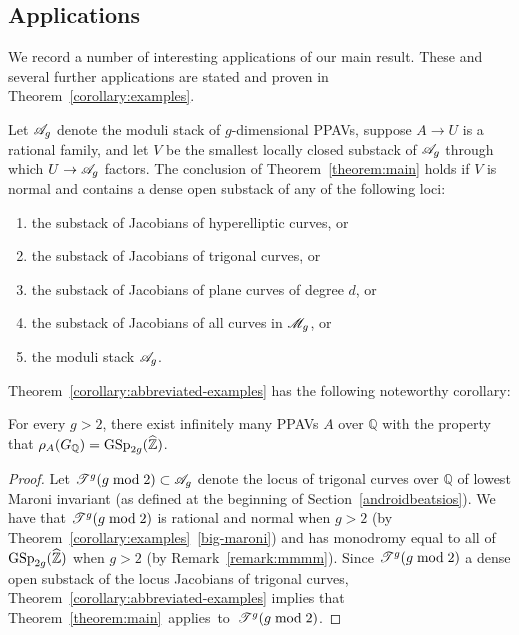 \subsection{Applications} We record a number of interesting applications of our main result. These and several further applications are stated and proven in
Theorem~\ref{corollary:examples}.
\begin{theorem}
	\label{corollary:abbreviated-examples}
	Let ${\mathscr A_g}$ denote the moduli stack of $g$-dimensional PPAVs, suppose $A \to U$ is a rational family, and let $V$ be
	the smallest locally closed substack of ${\mathscr A_g}$ through which $U \rightarrow {\mathscr A_g}$ factors.
	The conclusion of Theorem~\ref{theorem:main} holds if $V$ is normal and contains a dense open substack of any of the following loci:
	\begin{enumerate}
		\item the substack of Jacobians of hyperelliptic curves, or
		\item the substack of Jacobians of trigonal curves, or
		\item the substack of Jacobians of plane curves of degree $d$, or
		\item the substack of Jacobians of all curves in ${\mathscr M_g}$, or
		\item the moduli stack ${\mathscr A_g}$.
	\end{enumerate}
\end{theorem}
Theorem~\ref{corollary:abbreviated-examples} has the following noteworthy corollary:

\begin{corollary}
	\label{corollary:infinitely-many-maximal-image}
	For every $g > 2$, there exist infinitely many PPAVs $A$ over $\mathbb Q$
	with the property that $\rho_A(G_\mathbb Q) = \operatorname{GSp}_{2g}(\widehat{\mathbb Z})$.
\end{corollary}
\begin{proof}
Let $\mathscr T^{g}(g\bmod 2) \subset {\mathscr A_g}$ denote the locus of trigonal curves over $\mathbb Q$ of lowest Maroni invariant
(as defined at the beginning of Section~\ref{androidbeatsios}).
We have that $\mathscr T^{g}(g\bmod 2)$ is rational and normal when $g > 2$ (by
Theorem~\ref{corollary:examples}~\ref{big-maroni}) and has monodromy equal to all of $\operatorname{GSp}_{2g}(\widehat{\mathbb Z})$
when $g > 2$
(by Remark~\ref{remark:mmmm}).
Since $\mathscr T^{g}(g\bmod 2)$ a dense open substack of the
locus Jacobians of trigonal curves, Theorem~\ref{corollary:abbreviated-examples}
implies that \mbox{Theorem~\ref{theorem:main}
applies to $\mathscr T^{g}(g\bmod 2)$.\qedhere}
\end{proof}

